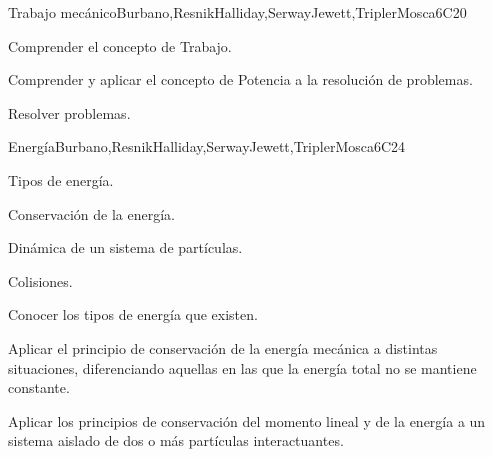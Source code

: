 \begin{syllabus}
\begin{unit}{}{Trabajo mecánico}{Burbano,ResnikHalliday,SerwayJewett,TriplerMosca}{6}{C20}
      \begin{learningoutcomes}
         \item Comprender el concepto de Trabajo.
         \item Comprender y aplicar el concepto de Potencia a la resolución de problemas.
         \item Resolver problemas.
      \end{learningoutcomes}
   \end{unit}
   
   \begin{unit}{}{Energía}{Burbano,ResnikHalliday,SerwayJewett,TriplerMosca}{6}{C24}
   \begin{topics}
         \item Tipos de energía.
         \item Conservación de la energía. 
         \item Dinámica de un sistema de partículas.
         \item Colisiones.
     \end{topics}
   
      \begin{learningoutcomes}
         \item Conocer los tipos de energía que existen.
         \item Aplicar el principio de conservación de la energía mecánica a distintas situaciones, diferenciando aquellas en las que la energía total no se mantiene constante. 
         \item Aplicar los principios de conservación del momento lineal y de la energía a un sistema aislado de dos o más partículas interactuantes.
      \end{learningoutcomes}
   \end{unit}
   
   \begin{coursebibliography}
   \end{coursebibliography}
   
   \end{syllabus}
   